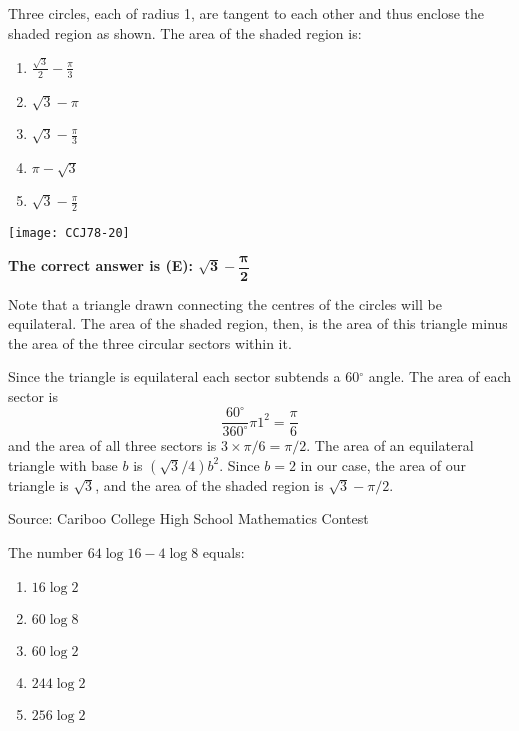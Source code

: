 \documentclass{article}
\begin{document}
\begin{minipage}[b]{0.6\textwidth}
	Three circles, each of radius 1, are tangent to each other and thus enclose the shaded region as shown. The area of the shaded region is:
	\\
	\begin{enumerate}[itemsep=0mm,topsep=0mm,leftmargin=*,widest=D,label=\Alph*)]
		\item $\frac{\sqrt{3}}{2} - \frac{\pi}{3}$
		\item $\sqrt{3} - \pi$
		\item $\sqrt{3} - \frac{\pi}{3}$
		\item $\pi - \sqrt{3}$
		\item $\sqrt{3} - \frac{\pi}{2}$
	\end{enumerate}
\end{minipage}
\begin{minipage}[b]{0.35\textwidth}
	\raggedleft
	\texttt{[image: CCJ78-20]}
\end{minipage}

\textbf{The correct answer is (E): $\mathbf{\sqrt{3} - \dfrac{\pmb{\pi}}{2}}$}

Note that a triangle drawn connecting the centres of the circles will be equilateral. The area of the shaded region, then, is the area of this triangle minus the area of the three circular sectors within it.

Since the triangle is equilateral each sector subtends a 60$^\circ$ angle. The area of each sector is
\[
\frac{60^\circ}{360^\circ} \pi 1^2 = \frac{\pi}{6}
\]
and the area of all three sectors is $3 \times \pi/6 = \pi/2$. The area of an equilateral triangle with base $b$ is $(\sqrt{3}/4)b^2$. Since $b = 2$ in our case, the area of our triangle is $\sqrt{3}$, and the area of the shaded region is $\sqrt{3} - \pi/2$.
 
\vskip 1.5cm


\scriptsize
Source: Cariboo College High School Mathematics Contest

\normalsize
The number $64 \log 16 - 4 \log 8$ equals:
\begin{enumerate}[noitemsep,topsep=0mm,leftmargin=*,widest=D,label=\Alph*)]
	\item $16 \log 2$
	\item $60 \log 8$
	\item $60 \log 2$
	\item $244 \log 2$
	\item $256 \log 2$
\end{enumerate}
\end{document}
